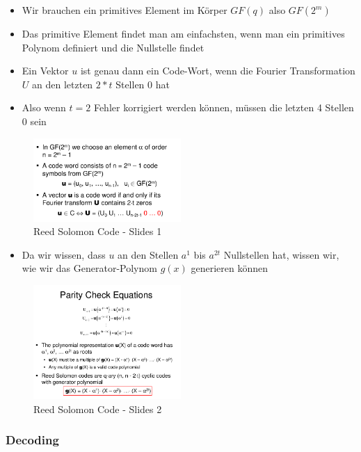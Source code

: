 \begin{itemize}
\tightlist
\item
  Wir brauchen ein primitives Element im Körper $GF(q)$ also $GF(2^m)$
\item
  Das primitive Element findet man am einfachsten, wenn man ein
  primitives Polynom definiert und die Nullstelle findet
\item
  Ein Vektor $u$ ist genau dann ein Code-Wort, wenn die Fourier
  Transformation $U$ an den letzten $2*t$ Stellen 0 hat
\item
  Also wenn $t = 2$ Fehler korrigiert werden können, müssen die letzten 4
  Stellen 0 sein
\end{itemize}

\begin{figure}[H]
\centering
\includegraphics[width=0.5\textwidth]{figures/reedSolomonCode.png}
\caption{Reed Solomon Code - Slides 1}
\end{figure}

\begin{itemize}
\tightlist
\item
  Da wir wissen, dass $u$ an den Stellen $a^1$ bis $a^{2t}$ Nullstellen hat,
  wissen wir, wie wir das Generator-Polynom $g(x)$ generieren können
\end{itemize}

\begin{figure}[H]
\centering
\includegraphics[width=0.5\textwidth]{figures/reedSolomonCode2.png}
\caption{Reed Solomon Code - Slides 2}
\end{figure}

\hypertarget{decoding}{%
\subsubsection{Decoding}\label{decoding}}

